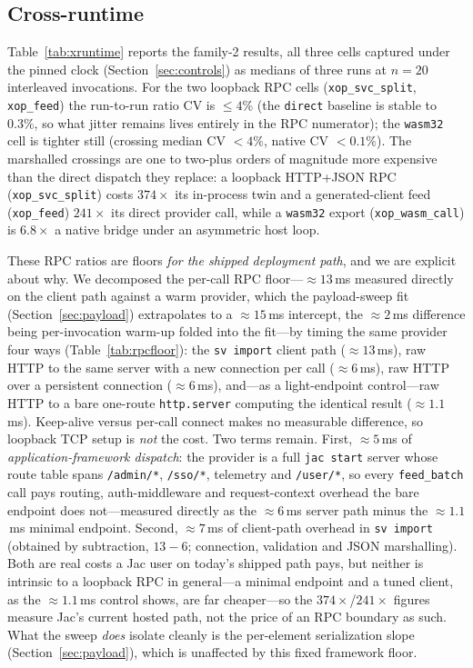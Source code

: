 \documentclass[conference]{IEEEtran}
\newcommand{\code}[1]{\texttt{#1}}
\begin{document}
\subsection{Cross-runtime}

Table~\ref{tab:xruntime} reports the family-2 results, all three cells
captured under the pinned clock (Section~\ref{sec:controls}) as medians of three
runs at $n{=}20$ interleaved invocations. For the two loopback RPC cells (\code{xop\_svc\_split},
\code{xop\_feed}) the run-to-run ratio CV is $\le$$4\%$ (the \code{direct}
baseline is stable to $0.3\%$, so what jitter remains lives entirely in the RPC
numerator); the \code{wasm32} cell is tighter still (crossing median CV
$<$$4\%$, native CV $<$$0.1\%$). The marshalled crossings are one to two-plus
orders of magnitude more expensive than the direct dispatch they replace: a
loopback HTTP+JSON RPC (\code{xop\_svc\_split}) costs $374\times$ its in-process
twin and a generated-client feed (\code{xop\_feed}) $241\times$ its direct
provider call, while a \code{wasm32} export (\code{xop\_wasm\_call}) is
$6.8\times$ a native bridge under an asymmetric host loop.

These RPC ratios are floors \emph{for the shipped deployment path}, and we are
explicit about why. We decomposed the per-call RPC floor---$\approx$$13$\,ms
measured directly on the client path against a warm provider, which the
payload-sweep fit (Section~\ref{sec:payload}) extrapolates to a $\approx$$15$\,ms
intercept, the $\approx$$2$\,ms difference being per-invocation warm-up folded
into the fit---by timing the same provider four ways (Table~\ref{tab:rpcfloor}):
the \code{sv~import} client path ($\approx$$13$\,ms), raw HTTP to the same server
with a new connection per call ($\approx$$6$\,ms), raw HTTP over a persistent
connection ($\approx$$6$\,ms), and---as a light-endpoint control---raw HTTP to a
bare one-route \code{http.server} computing the identical result
($\approx$$1.1$\,ms). Keep-alive versus per-call connect makes no measurable
difference, so loopback TCP setup is \emph{not} the cost. Two terms remain.
First, $\approx$$5$\,ms of \emph{application-framework dispatch}: the provider is
a full \code{jac start} server whose route table spans \code{/admin/*},
\code{/sso/*}, telemetry and \code{/user/*}, so every \code{feed\_batch} call
pays routing, auth-middleware and request-context overhead the bare endpoint does
not---measured directly as the $\approx$$6$\,ms server path minus the
$\approx$$1.1$\,ms minimal endpoint. Second, $\approx$$7$\,ms of client-path
overhead in \code{sv~import} (obtained by subtraction, $13-6$; connection,
validation and JSON marshalling). Both are real costs a Jac user on today's
shipped path pays, but neither is intrinsic to a loopback RPC in general---a
minimal endpoint and a tuned client, as the $\approx$$1.1$\,ms control shows, are
far cheaper---so the $374\times$/$241\times$ figures measure Jac's current hosted
path, not the price of an RPC boundary as such. What the sweep \emph{does} isolate
cleanly is the per-element serialization slope (Section~\ref{sec:payload}), which
is unaffected by this fixed framework floor.
\end{document}
